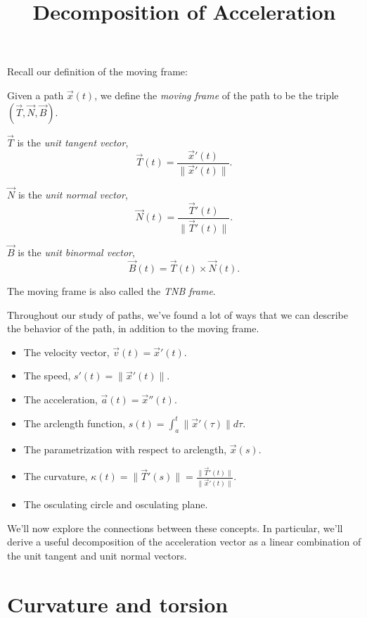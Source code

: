 \documentclass{ximera}
\title{Decomposition of Acceleration}
\begin{document}
\begin{abstract}
\end{abstract}
\maketitle

Recall our definition of the moving frame:

\begin{definition}
Given a path $\vec{x}(t)$, we define the \emph{moving frame} of the path to be the triple $(\vec{T},\vec{N},\vec{B})$.

$\vec{T}$ is the \emph{unit tangent vector},
\[
\vec{T}(t) = \dfrac{\vec{x}'(t)}{\|\vec{x}'(t)\|}.
\]

$\vec{N}$ is the \emph{unit normal vector},
\[
\vec{N}(t) = \dfrac{\vec{T}'(t)}{\|\vec{T}'(t)\|}.
\]

$\vec{B}$ is the \emph{unit binormal vector},
\[
\vec{B}(t) = \vec{T}(t)\times\vec{N}(t).
\] 

The moving frame is also called the \emph{TNB frame}.
\end{definition}

Throughout our study of paths, we've found a lot of ways that we can describe the behavior of the path, in addition to the moving frame.
\begin{itemize}
\item The velocity vector, $\vec{v}(t)= \vec{x}'(t)$.
\item The speed, $s'(t) = \|\vec{x}'(t)\|$.
\item The acceleration, $\vec{a}(t) = \vec{x}''(t)$.
\item The arclength function, $s(t) = \int_a^t \|\vec{x}'(\tau)\|d\tau$.
\item The parametrization with respect to arclength, $\vec{x}(s)$.
\item The curvature, $\kappa(t) = \|\vec{T}'(s)\| = \frac{\|\vec{T}'(t)\|}{\|\vec{x}'(t)\|}$.
\item The osculating circle and osculating plane.
\end{itemize}

We'll now explore the connections between these concepts. In particular, we'll derive a useful decomposition of the acceleration vector as a linear combination of the unit tangent and unit normal vectors.

\section*{Curvature and torsion}
\end{document}
